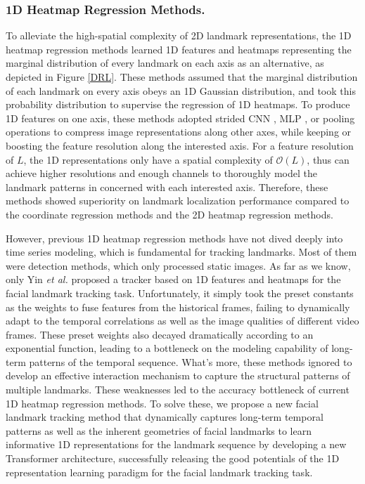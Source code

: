 \documentclass[review]{elsarticle}
\begin{document}
\subsubsection{1D Heatmap Regression Methods.}
\label{related_1D}
To alleviate the high-spatial complexity of 2D landmark representations, the 1D heatmap regression methods \cite{AOHR, DBLP:conf/accv/XiongZDS20,I2L, SimCC, chi2022human,DBLP:journals/remotesensing/LiuZCW22} learned 1D features and heatmaps representing the marginal distribution of every landmark on each axis as an alternative, as depicted in Figure \ref{DRL}. These methods assumed that the marginal distribution of each landmark on every axis obeys an 1D Gaussian distribution, and took this probability distribution to supervise the regression of 1D heatmaps. To produce 1D features on one axis, these methods adopted strided CNN \cite{AOHR}, MLP \cite{SimCC}, or pooling operations \cite{I2L} to compress image representations along other axes, while keeping or boosting the feature resolution along the interested axis. For a feature resolution of $L$, the 1D representations only have a spatial complexity of $\mathcal{O}(L)$, thus can achieve higher resolutions and enough channels to thoroughly model the landmark patterns in concerned with each interested axis. Therefore, these methods showed superiority on landmark localization performance compared to the coordinate regression methods and the 2D heatmap regression methods.

However, previous 1D heatmap regression methods have not dived deeply into time series modeling, which is fundamental for tracking landmarks. Most of them \cite{DBLP:conf/accv/XiongZDS20,I2L, SimCC, chi2022human,DBLP:journals/remotesensing/LiuZCW22, HybridMatch} were detection methods, which only processed static images. As far as we know, only Yin \textit{et al.} \cite{AOHR} proposed a tracker based on 1D features and heatmaps for the facial landmark tracking task. Unfortunately, it simply took the preset constants as the weights to fuse features from the historical frames, failing to dynamically adapt to the temporal correlations as well as the image qualities of different video frames. These preset weights also decayed dramatically according to an exponential function, leading to a bottleneck on the modeling capability of long-term patterns of the temporal sequence.  What's more, these methods ignored to develop an effective interaction mechanism to capture the structural patterns of multiple landmarks. These weaknesses led to the accuracy bottleneck of current 1D heatmap regression methods. To solve these, we propose a new facial landmark tracking method that dynamically captures long-term temporal patterns as well as the inherent geometries of facial landmarks to learn informative 1D representations for the landmark sequence by developing a new Transformer architecture, successfully releasing the good potentials of the 1D representation learning paradigm for the facial landmark tracking task.
\end{document}
